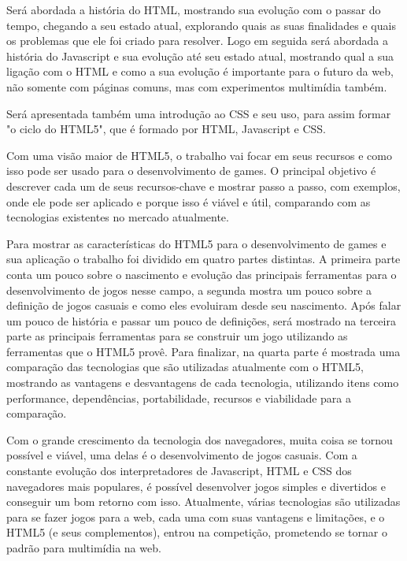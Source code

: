 Será abordada a história do HTML, mostrando sua evolução com o passar do tempo, chegando
a seu estado atual, explorando quais as suas finalidades e quais os problemas que ele foi criado para resolver.
Logo em seguida será abordada a história do Javascript e sua evolução até seu estado
atual, mostrando qual a sua ligação com o HTML e como a sua evolução é importante
para o futuro da web, não somente com páginas comuns, mas com experimentos multimídia também.

Será apresentada também uma introdução ao CSS e seu uso, para assim formar "o ciclo
do HTML5", que é formado por HTML, Javascript e CSS.

Com uma visão maior de HTML5, o trabalho vai focar em seus recursos e como isso pode
ser usado para o desenvolvimento de games. O principal objetivo é
descrever cada um de seus recursos-chave e mostrar passo a passo, com exemplos, onde ele pode ser aplicado e porque isso
é viável e útil, comparando com as tecnologias existentes no mercado atualmente.

Para mostrar as características do HTML5 para o desenvolvimento de
games e sua aplicação o trabalho foi dividido em quatro partes
distintas. A primeira parte conta um pouco sobre o nascimento e
evolução das principais ferramentas para o desenvolvimento de jogos
nesse campo, a segunda mostra um pouco sobre a definição de jogos casuais e como
eles evoluiram desde seu nascimento. Após falar um pouco de história e
passar um pouco de definições, será mostrado na terceira parte as
principais ferramentas para se construir um jogo utilizando as
ferramentas que o HTML5 provê. Para finalizar, na quarta parte é
mostrada uma comparação das tecnologias que são utilizadas atualmente
com o HTML5, mostrando as vantagens e desvantagens de cada tecnologia,
utilizando itens como performance, dependências, portabilidade,
recursos e viabilidade para a comparação.

Com o grande crescimento da tecnologia dos navegadores, muita coisa se tornou possível
e viável, uma delas é o desenvolvimento de jogos casuais. Com a constante evolução
dos interpretadores de Javascript, HTML e CSS dos navegadores mais populares, é possível
desenvolver jogos simples e divertidos e conseguir um bom retorno com isso. Atualmente,
várias tecnologias são utilizadas para se fazer jogos para a web, cada uma com suas
vantagens e limitações, e o HTML5 (e seus complementos), entrou na competição, prometendo
se tornar o padrão para multimídia na web.
